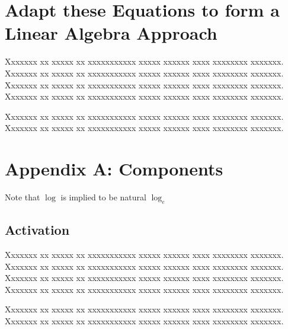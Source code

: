 \documentclass{article}
\begin{document}
\section{Adapt these Equations to form a Linear Algebra Approach}

Xxxxxxx xx xxxxx xx xxxxxxxxxxx xxxxx xxxxxx xxxx xxxxxxxx xxxxxxx.
Xxxxxxx xx xxxxx xx xxxxxxxxxxx xxxxx xxxxxx xxxx xxxxxxxx xxxxxxx.
Xxxxxxx xx xxxxx xx xxxxxxxxxxx xxxxx xxxxxx xxxx xxxxxxxx xxxxxxx.
Xxxxxxx xx xxxxx xx xxxxxxxxxxx xxxxx xxxxxx xxxx xxxxxxxx xxxxxxx.

Xxxxxxx xx xxxxx xx xxxxxxxxxxx xxxxx xxxxxx xxxx xxxxxxxx xxxxxxx.
Xxxxxxx xx xxxxx xx xxxxxxxxxxx xxxxx xxxxxx xxxx xxxxxxxx xxxxxxx.




\nocite{berns:91}
\nocite{hecht:90}
\nocite{kosko:92}

\clearpage


\section*{Appendix A: Components}

Note that $\log$ is implied to be natural $\log_e$

\subsection{Activation}

Xxxxxxx xx xxxxx xx xxxxxxxxxxx xxxxx xxxxxx xxxx xxxxxxxx xxxxxxx.
Xxxxxxx xx xxxxx xx xxxxxxxxxxx xxxxx xxxxxx xxxx xxxxxxxx xxxxxxx.
Xxxxxxx xx xxxxx xx xxxxxxxxxxx xxxxx xxxxxx xxxx xxxxxxxx xxxxxxx.
Xxxxxxx xx xxxxx xx xxxxxxxxxxx xxxxx xxxxxx xxxx xxxxxxxx xxxxxxx.

Xxxxxxx xx xxxxx xx xxxxxxxxxxx xxxxx xxxxxx xxxx xxxxxxxx xxxxxxx.
Xxxxxxx xx xxxxx xx xxxxxxxxxxx xxxxx xxxxxx xxxx xxxxxxxx xxxxxxx.

\end{document}
